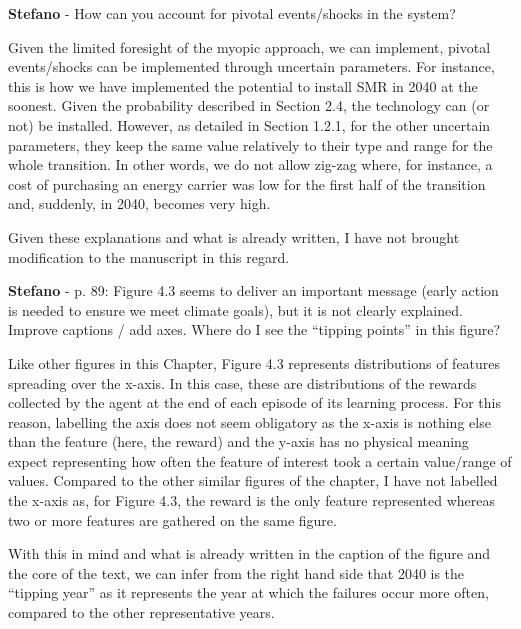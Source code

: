 \documentclass[12pt,a4paper]{article}
\begin{document}
\begin{mdframed}[style=comment] %
{\color{orange} \textbf{Stefano}} - How can you account for pivotal events/shocks in the system?
\end{mdframed}

\noindent Given the limited foresight of the myopic approach, we can implement, pivotal events/shocks can be implemented through uncertain parameters. For instance, this is how we have implemented the potential to install SMR in 2040 at the soonest. Given the probability described in Section 2.4, the technology can (or not) be installed. However, as detailed in Section 1.2.1, for the other uncertain parameters, they keep the same value relatively to their type and range for the whole transition. In other words, we do not allow zig-zag where, for instance, a cost of purchasing an energy carrier was low for the first half of the transition and, suddenly, in 2040, becomes very high.

Given these explanations and what is already written, I have not brought modification to the manuscript in this regard.

\begin{mdframed}[style=comment] %
{\color{orange} \textbf{Stefano}} - p. 89: Figure 4.3 seems to deliver an important message (early action is needed to ensure we meet climate goals), but it is not clearly explained. Improve captions / add axes. 	Where do I see the ``tipping points'' in this figure?
\end{mdframed}

\noindent Like other figures in this Chapter, Figure 4.3 represents distributions of features spreading over the x-axis. In this case, these are distributions of the rewards collected by the agent at the end of each episode of its learning process. For this reason, labelling the axis does not seem obligatory as the x-axis is nothing else than the feature (here, the reward) and the y-axis has no physical meaning expect representing how often the feature of interest took a certain value/range of values. Compared to the other similar figures of the chapter, I have not labelled the x-axis as, for Figure 4.3, the reward is the only feature represented whereas two or more features are gathered on the same figure.

With this in mind and what is already written in the caption of the figure and the core of the text, we can infer from the right hand side that 2040 is the ``tipping year'' as it represents the year at which the failures occur more often, compared to the other representative years. 
\end{document}
